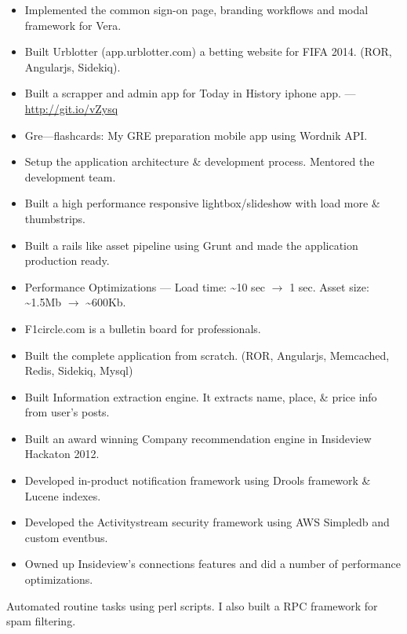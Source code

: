 \documentclass{resume}
\begin{document}
\begin{itemize} \itemsep1pt \parskip0pt
  \item Implemented the common sign-on page, branding workflows and modal framework for Vera.
  \item Built Urblotter (app.urblotter.com) a betting website for FIFA 2014. (ROR, Angularjs, Sidekiq).
  \item Built a scrapper and admin app for Today in History iphone app. --- \url{http://git.io/vZysq}
  \item Gre---flashcards: My GRE preparation mobile app using Wordnik API\@.
\end{itemize}
\begin{itemize} \itemsep1pt \parskip0pt
  \item Setup the application architecture \& development process. Mentored the development team.
  \item Built a high performance responsive lightbox/slideshow with load more \& thumbstrips.
  \item Built a rails like asset pipeline using Grunt and made the application production ready.
  \item Performance Optimizations --- Load time: \textasciitilde10 sec \( \rightarrow \) 1 sec.  
    Asset size: \textasciitilde1.5Mb \( \rightarrow \) \textasciitilde600Kb.
\end{itemize}
\begin{itemize} \itemsep1pt \parskip0pt
  \item F1circle.com is a bulletin board for professionals.
  \item Built the complete application from scratch. (ROR, Angularjs, Memcached, Redis, Sidekiq, Mysql)
  \item Built Information extraction engine. It extracts name, place, \& price info from user's posts.
\end{itemize}
\begin{itemize} \itemsep1pt \parskip0pt
  \item Built an award winning Company recommendation engine in Insideview Hackaton 2012.
  \item Developed in-product notification framework using Drools framework \& Lucene indexes.
  \item Developed the Activitystream security framework using AWS Simpledb and custom eventbus.
  \item Owned up Insideview's connections features and did a number of performance optimizations.
\end{itemize}
Automated routine tasks using perl scripts.  I also built a RPC framework for spam filtering.
 
\end{document}
